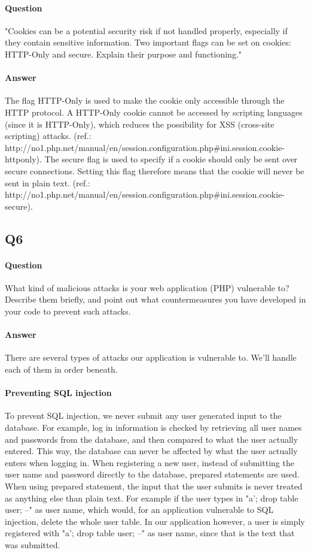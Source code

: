 \documentclass[11pt, a4paper]{article}
\begin{document}
\paragraph{Question}
"Cookies can be a potential security risk if not handled properly, especially if they contain
sensitive information. Two important flags can be set on cookies: HTTP-Only and secure.
Explain their purpose and functioning."
\paragraph{Answer}
The flag HTTP-Only is used to make the cookie only accessible through the HTTP protocol. A HTTP-Only cookie cannot be accessed by scripting languages (since it is HTTP-Only), which reduces the possibility for XSS (cross-site scripting) attacks. (ref.: http://no1.php.net/manual/en/session.configuration.php\#ini.session.cookie-httponly).
The secure flag is used to specify if a cookie should only be sent over secure connections. Setting this flag therefore means that the cookie will never be sent in plain text. (ref.: http://no1.php.net/manual/en/session.configuration.php\#ini.session.cookie-secure).
\subsection{Q6}
\paragraph{Question}
What kind of malicious attacks is your web application (PHP) vulnerable to? Describe
them briefly, and point out what countermeasures you have developed in your code to prevent
such attacks.
\paragraph{Answer}
There are several types of attacks our application is vulnerable to. We'll handle each of them in order beneath.
\paragraph{Preventing SQL injection}
To prevent SQL injection, we never submit any user generated input to the database. For example, log in information is checked by retrieving all user names and passwords from the database, and then compared to what the user actually entered. This way, the database can never be affected by what the user actually enters when logging in.
When registering a new user, instead of submitting the user name and password directly to the database, prepared statements are used. When using prepared statement, the input that the user submits is never treated as anything else than plain text. For example if the user types in "a'; drop table user; --" as user name, which would, for an application vulnerable to SQL injection, delete the whole user table. In our application however, a user is simply registered with "a'; drop table user; --" as user name, since that is the text that was submitted.
\end{document}
